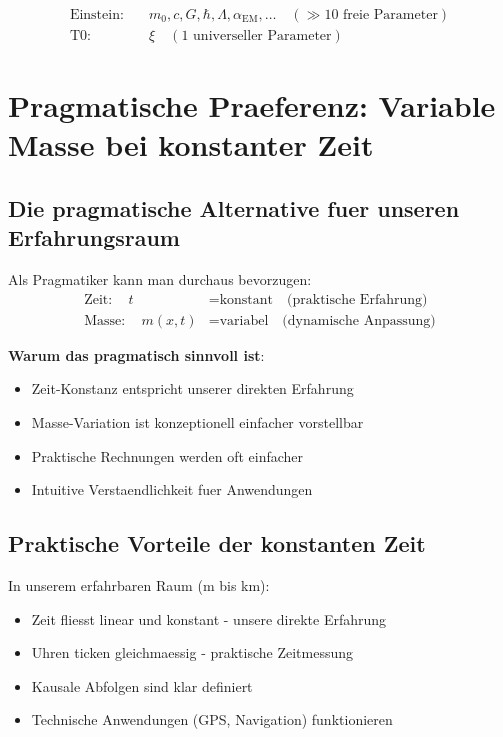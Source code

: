 \documentclass[12pt,a4paper]{article}
\newcommand{\xipar}{\xi}
\theoremstyle{definition}
\theoremstyle{remark}
\begin{document}
	\begin{align}
		\text{Einstein}: \quad &m_0, c, G, \hbar, \Lambda, \alpha_{\text{EM}}, \ldots \quad (\gg 10 \text{ freie Parameter}) \\
		\text{T0}: \quad &\xipar \quad (1 \text{ universeller Parameter})
	\end{align}
	
	\section{Pragmatische Praeferenz: Variable Masse bei konstanter Zeit}
	
	\subsection{Die pragmatische Alternative fuer unseren Erfahrungsraum}
	
	Als Pragmatiker kann man durchaus bevorzugen:
	\begin{align}
		\text{Zeit}: \quad t &= \text{konstant} \quad \text{(praktische Erfahrung)} \\
		\text{Masse}: \quad m(x,t) &= \text{variabel} \quad \text{(dynamische Anpassung)}
	\end{align}
	
	\textbf{Warum das pragmatisch sinnvoll ist}:
	\begin{itemize}
		\item Zeit-Konstanz entspricht unserer direkten Erfahrung
		\item Masse-Variation ist konzeptionell einfacher vorstellbar
		\item Praktische Rechnungen werden oft einfacher
		\item Intuitive Verstaendlichkeit fuer Anwendungen
	\end{itemize}
	
	\subsection{Praktische Vorteile der konstanten Zeit}
	
	In unserem erfahrbaren Raum (m bis km):
	\begin{itemize}
		\item Zeit fliesst linear und konstant - unsere direkte Erfahrung
		\item Uhren ticken gleichmaessig - praktische Zeitmessung
		\item Kausale Abfolgen sind klar definiert
		\item Technische Anwendungen (GPS, Navigation) funktionieren
	\end{itemize}
	
\end{document}
